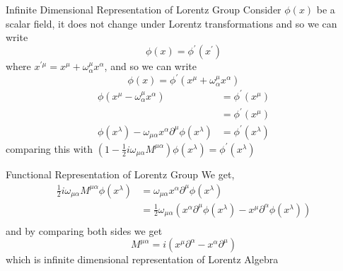 \documentclass{beamer}
\begin{document}
\begin{frame}{Infinite Dimensional Representation of Lorentz Group}
    Consider $\phi(x)$ be a scalar field, it does not change under Lorentz transformations and so we can write 
    \begin{equation}
        \phi(x) = \phi^{\prime}(x^{\prime})
    \end{equation} where $x^{\prime\mu} = x^{\mu} + \omega^{\mu}_{\alpha}x^{\alpha}$, and so we can write
    \begin{equation}
        \phi(x) = \phi^{\prime}(x^{\mu} + \omega^{\mu}_{\alpha}x^{\alpha})
    \end{equation}
    \begin{align}
        \phi(x^{\mu} - \omega^{\mu}_{\alpha}x^{\alpha}) &= \phi^{\prime}(x^{\mu}) \\
                                                                    &= 
                                                                    \phi^{\prime}(x^{\mu}) \\
                                                                    \phi(x^{\lambda}) - \omega_{\mu\alpha}x^{\alpha}\partial^{\mu}\phi(x^{\lambda}) &= \phi^{\prime}(x^{\lambda})
    \end{align} comparing this with $(1 - \frac{1}{2} i\omega_{\mu\alpha}M^{\mu\alpha})\phi(x^{\lambda}) = \phi^{\prime}(x^{\lambda})$
\end{frame}
\begin{frame}{Functional Representation of Lorentz Group}
    We get,
    \begin{align}
        \frac{1}{2} i\omega_{\mu\alpha}M^{\mu\alpha}\phi(x^{\lambda}) &= \omega_{\mu\alpha}x^{\alpha}\partial^{\mu}\phi(x^{\lambda}) \\
                                                                      &= 
                                                                      \frac{1}{2}\omega_{\mu\alpha}(x^{\alpha}\partial^{\mu}\phi(x^{\lambda}) - x^{\mu}\partial^{\alpha}\phi(x^{\lambda})) \\
    \end{align} and by comparing both sides we get 
    \begin{equation}
        M^{\mu\alpha} = i(x^{\mu}\partial^{\alpha} - x^{\alpha}\partial^{\mu})
    \end{equation} which is infinite dimensional representation of Lorentz Algebra
\end{frame}
\end{document}
